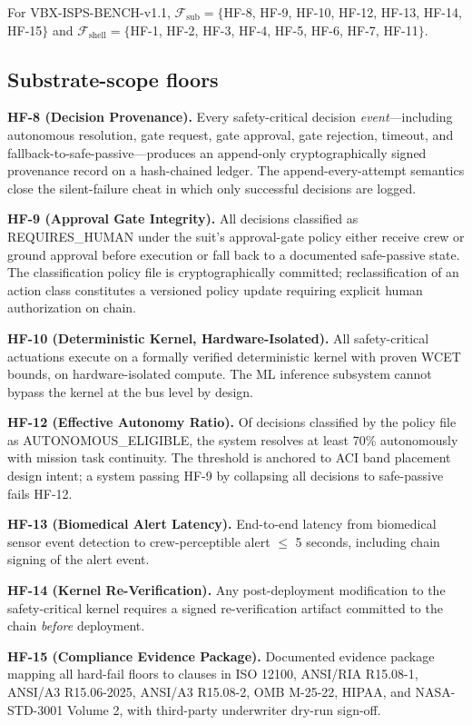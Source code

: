 \documentclass[conference]{IEEEtran}
\theoremstyle{definition}
\theoremstyle{plain}
\theoremstyle{remark}
\begin{document}
For VBX-ISPS-BENCH-v1.1, $\mathcal{F}_{\text{sub}} = \{$HF-8, HF-9, HF-10, HF-12, HF-13, HF-14, HF-15$\}$ and $\mathcal{F}_{\text{shell}} = \{$HF-1, HF-2, HF-3, HF-4, HF-5, HF-6, HF-7, HF-11$\}$.

\subsection{Substrate-scope floors}

\textbf{HF-8 (Decision Provenance).} Every safety-critical decision \emph{event}---including autonomous resolution, gate request, gate approval, gate rejection, timeout, and fallback-to-safe-passive---produces an append-only cryptographically signed provenance record on a hash-chained ledger. The append-every-attempt semantics close the silent-failure cheat in which only successful decisions are logged.

\textbf{HF-9 (Approval Gate Integrity).} All decisions classified as REQUIRES\_HUMAN under the suit's approval-gate policy either receive crew or ground approval before execution or fall back to a documented safe-passive state. The classification policy file is cryptographically committed; reclassification of an action class constitutes a versioned policy update requiring explicit human authorization on chain.

\textbf{HF-10 (Deterministic Kernel, Hardware-Isolated).} All safety-critical actuations execute on a formally verified deterministic kernel with proven WCET bounds, on hardware-isolated compute. The ML inference subsystem cannot bypass the kernel at the bus level by design.

\textbf{HF-12 (Effective Autonomy Ratio).} Of decisions classified by the policy file as AUTONOMOUS\_ELIGIBLE, the system resolves at least 70\% autonomously with mission task continuity. The threshold is anchored to ACI band placement design intent; a system passing HF-9 by collapsing all decisions to safe-passive fails HF-12.

\textbf{HF-13 (Biomedical Alert Latency).} End-to-end latency from biomedical sensor event detection to crew-perceptible alert $\leq$ 5 seconds, including chain signing of the alert event.

\textbf{HF-14 (Kernel Re-Verification).} Any post-deployment modification to the safety-critical kernel requires a signed re-verification artifact committed to the chain \emph{before} deployment.

\textbf{HF-15 (Compliance Evidence Package).} Documented evidence package mapping all hard-fail floors to clauses in ISO 12100, ANSI/RIA R15.08-1, ANSI/A3 R15.06-2025, ANSI/A3 R15.08-2, OMB M-25-22, HIPAA, and NASA-STD-3001 Volume 2, with third-party underwriter dry-run sign-off.
\end{document}
